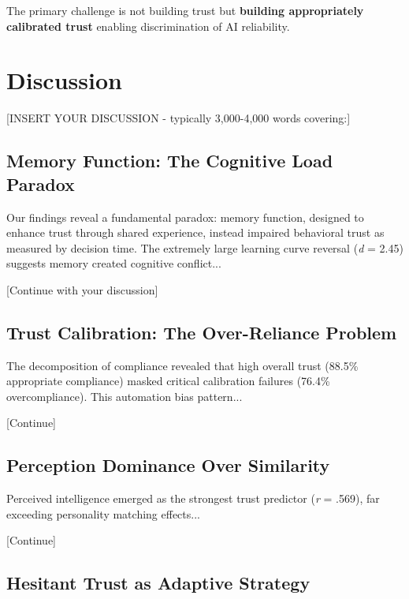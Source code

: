 \documentclass[12pt]{article}
\begin{document}
The primary challenge is not building trust but \textbf{building appropriately calibrated trust} enabling discrimination of AI reliability.

\section{Discussion}

[INSERT YOUR DISCUSSION - typically 3,000-4,000 words covering:]

\subsection{Memory Function: The Cognitive Load Paradox}

Our findings reveal a fundamental paradox: memory function, designed to enhance trust through shared experience, instead impaired behavioral trust as measured by decision time. The extremely large learning curve reversal (\textit{d} = 2.45) suggests memory created cognitive conflict...

[Continue with your discussion]

\subsection{Trust Calibration: The Over-Reliance Problem}

The decomposition of compliance revealed that high overall trust (88.5\% appropriate compliance) masked critical calibration failures (76.4\% overcompliance). This automation bias pattern...

[Continue]

\subsection{Perception Dominance Over Similarity}

Perceived intelligence emerged as the strongest trust predictor (\textit{r} = .569), far exceeding personality matching effects...

[Continue]

\subsection{Hesitant Trust as Adaptive Strategy}
\end{document}
